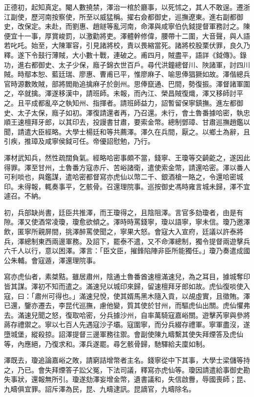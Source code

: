 \begin{pinyinscope}
正德初，起知真定。閹人數撓禁，澤治一棺於廳事，以死怵之，其人不敢逞。遷浙江副使，歷河南按察使，所至以威猛稱。擢右僉都御史，巡撫遼東。進右副都御史，改保定。未赴，而劉惠、趙鐩等亂河南，命澤與咸寧伯仇鉞提督軍務討之。陳便宜十一事，厚賞峻罰，以激勸將吏。澤體幹修偉，腰帶十二圍，大音聲，與人語若叱吒。始至，大陳軍容，引見諸將校，責以畏縮當死。諸將校股栗伏罪，良久乃釋。遂下令鼓行薄賊，大小數十戰，連破之。甫四月，賊盡平，語詳《鉞傳》。錄功，進右都御史、太子少保，廕子錦衣世百戶。尋代洪鐘總督川、陜諸軍，討四川賊。時鄢本恕、藍廷瑞、廖惠、曹甫已平，惟廖麻子、喻思俸猖獗如故。澤偕總兵官時源數敗賊，部將閻勛追擒麻子於劍州。思俸竄通、巴間，勢復振。澤督諸軍圍之，卒就擒。澤遂移漢中，請班師。未報，而內江、榮昌賊復熾，澤又移師討平之。且平成都亂卒之執知州、指揮者。請班師益力，詔暫留保寧鎮撫。進左都御史、太子太保，廕子如初。澤復請還者再，乃召還。未行，會土魯番據哈密，執忠順王速檀拜牙郎，以其印去，投謾書甘肅，要索金幣。總制鄧璋、甘肅巡撫趙鑑以聞，請遣大臣經略。大學士楊廷和等共薦澤。澤久在兵間，厭之。以鄉土為辭，且引疾，推璋及咸寧侯鉞可任。帝優詔慰勉，乃行。

澤材武知兵，然性疏闊負氣。經略哈密事頗不當，錢寧、王瓊等交齮齕之，遂因此得罪。澤至甘州，土魯番方寇赤斤、苦峪諸衛，遣使索金幣，請還哈密。澤以番人可利啖也，與鑑謀，遣哈密都督寫亦虎仙以幣二千、銀酒槍一賂之，令還哈密城印。未得報，輒奏事平，乞骸骨。召還理院事。巡按御史馮時雍言城未歸，澤不宜遽召。不納。

初，兵部缺尚書，廷臣共推澤，而王瓊得之，且陰阻澤。言官多劾瓊者，由是有隙。澤又使酒常凌瓊，瓊愈欲傾之。澤時時罵錢寧，瓊以語寧，寧未信。瓊乃邀澤飲，匿寧所親屏間，挑澤醉罵使聞之，寧果大怒。會寇大入宣府，廷議以許泰將兵，澤總制東西兩邊軍務。及詔下，罷泰不遣，又不命澤總制，獨令提督兩遊擊兵六千人以行，意以困澤。澤言：「臣文臣，摧鋒陷陣非臣所能獨任。」瓊乃奏遣成國公朱輔。會寇遁，澤還理院事。

寫亦虎仙者，素桀黠。雖居肅州，陰通土魯番酋速檀滿速兒，為之耳目，據城奪印皆其謀。澤初不知而遣之。滿速兒以城印來歸，留速檀拜牙郎如故。虎仙復啖使入寇，曰：「肅州可得也。」滿速兒悅，使其婿馬黑木隨入貢，以覘虛實，且徵賄。澤已還，鑒亦遷去，李昆代巡撫，慮他變，質其使於甘州，而驅虎仙出關。虎仙懼弗去。滿速兒聞之怒，復取哈密，分兵據沙州，自率萬騎寇嘉峪關。遊擊芮寧與參將蔣存禮禦之。寧以七百人先遇寇沙子壩。寇圍寧，而分兵綴存禮軍。寧軍盡沒，遂墮城堡，縱殺掠。詔澤提督三邊軍務往禦。會副使陳九疇繫其使失拜煙答及虎仙等，內應絕，乃復求和。澤兵遂罷。尋乞骸骨歸，馳驛給夫廩如制。

澤既去，瓊追論嘉峪之敗，請窮詰增幣者主名。錢寧從中下其事，大學士梁儲等持之，乃已。會失拜煙答子訟父冤，下法司議，釋寫亦虎仙等。瓊因請遣給事御史勘失事狀，還報無所引。瓊遂劾澤妄增金幣，遺書議和，失信啟釁，辱國喪師；昆、九疇俱宜罪。詔斥澤為民，昆、九疇逮訊。昆謫官，九疇除名。


\end{pinyinscope}
